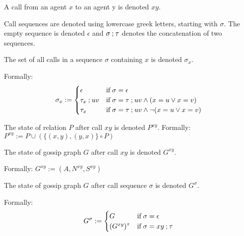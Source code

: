 \begin{definition}[Calls]
    \label{def:calls}
    A call from an agent \(x\) to an agent y is denoted \(xy\).

    \begin{subdefinition}
        \label{def:call-sequence}
        Call sequences are denoted using lowercase greek letters, starting with \(\sigma\). The empty sequence is denoted \(\epsilon\) and \(\sigma \mathbin{;} \tau\) denotes the concatenation of two sequences.
    \end{subdefinition}
    
    \begin{subdefinition}[Subsequence]
        The set of all calls in a sequence \(\sigma\) containing \(x\) is denoted \(\sigma_x\).

        Formally:
        \[
            \sigma_x := 
            \begin{cases} 
                \epsilon            & \text{if}\; \sigma = \epsilon\\
                \tau_x\mathbin{;}uv & \text{if}\; \sigma = \tau \mathbin{;} uv \land (x = u \lor x = v) \\ 
                \tau_x              & \text{if}\; \sigma = \tau \mathbin{;} uv \land \lnot(x = u \lor x = v) 
            \end{cases}
        \]
    \end{subdefinition}

    \begin{subdefinition}
        \label{def:call-effect-relation}
        The state of relation \(P\) after call \(xy\) is denoted \(P^{xy}\).
        Formally: \( P^{xy} := P \cup (\{(x,y),(y,x)\} \circ P) \)
    \end{subdefinition}

    \begin{subdefinition}
        \label{def:call-effect-graph}
        The state of gossip graph \(G\) after call \(xy\) is denoted \(G^{xy}\).

        Formally: \( G^{xy} := (A,N^{xy},S^{xy}) \)
    \end{subdefinition}

    \begin{subdefinition}
        The state of gossip graph \(G\) after call sequence \(\sigma\) is denoted \(G^\sigma\).

        Formally: 
        \[ 
            G^\sigma := 
            \begin{cases}
                G               & \text{if}\; \sigma = \epsilon\\
                (G^{xy})^\tau   & \text{if}\; \sigma = xy \mathbin{;} \tau
            \end{cases}
        \]
    \end{subdefinition}


\end{definition}
